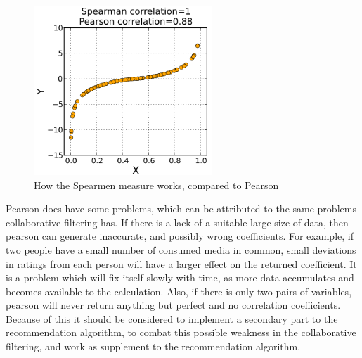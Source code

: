 \begin{figure}[htb]
\centering
\includegraphics[width=0.6\textwidth]{Images/spearman.png}
\caption{How the Spearmen measure works, compared to Pearson}
\label{Spearman}
\end{figure}

Pearson does have some problems, which can be attributed to the same problems collaborative filtering has. If there is a lack of a suitable large size of data, then pearson can generate inaccurate, and possibly wrong coefficients. For example, if two people have a small number of consumed media in common, small deviations in ratings from each person will have a larger effect on the returned coefficient. It is a problem which will fix itself slowly with time, as more data accumulates and becomes available to the calculation. Also, if there is only two pairs of variables, pearson will never return anything but perfect and no correlation coefficients. Because of this it should be considered to implement a secondary part to the recommendation algorithm, to combat this possible weakness in the collaborative filtering, and work as supplement to the recommendation algorithm.